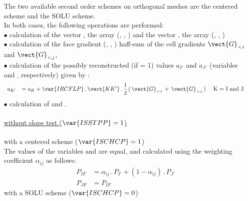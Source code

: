 The two available second order schemes on orthogonal meshes are the centered scheme and the SOLU scheme.
\\ In both cases, the following operations are performed:\\
$\bullet$ calculation of the vector , the array (, , ) and the vector , the array (, , )\\
$\bullet$ calculation of the face gradient (, , )
haff-sum of the cell gradients $\vect{G}_{\,c,i}$ and $\vect{G}_{\,c,j}$,\\
$\bullet$ calculation of the possibly reconstructed (if  = 1) values $a_{I'}$ and  $a_{J'}$ (variables  and , respectively) given by :
\begin{equation}\label{Base_Bilsc2_Eq_Rec_Dif2}
\begin{array}{lll}
a_{K'}&= a_K +  \var{IRCFLP}\,.\,\vect {KK'}\,.\,\displaystyle\frac{1}{2}\,(\,\vect{G}_{\,c,i}\,+\,\vect{G}_{\,c,j}\,)&\text{ K = I and J}\\
\end{array}
\end{equation}
$\bullet$ calculation of  and .\\\\
\hspace*{2cm}{\tiny$\blacksquare$} \underline{ without slope test ($\var{ISSTPP} = 1$)}\\\\
\hspace*{2.5cm}{\tiny$\bigstar$} with a centered scheme ($\var{ISCHCP} = 1$)\\
The values of the variables   and  are equal, and calculated 
using the weighting coefficient $\displaystyle\alpha_{ij}$ as follows:
\begin{equation}
\begin{array}{ll}
P_{IF} &=\displaystyle\alpha_{ij}\,.\, P_{I'} + (1 - \displaystyle\alpha_{ij})\,.\, P_{J'}\\
P_{JF} &= P_{IF}
\end{array}
\end{equation}
\hspace*{2.5cm}{\tiny$\bigstar$} with a SOLU scheme ($\var{ISCHCP} = 0$)\\\\

